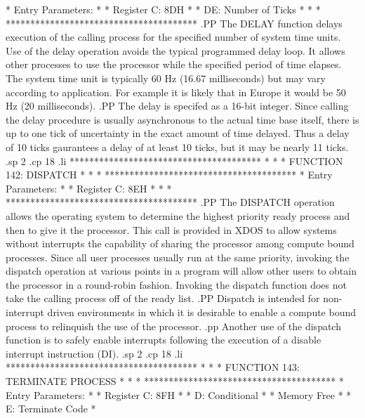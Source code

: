 *  Entry Parameters:                  *
*      Register   C:  8DH             *
*                DE:  Number of Ticks *
*                                     *
***************************************
.PP
The DELAY function delays execution of the
calling process for the specified number of system time units.
Use of the delay operation avoids the typical programmed delay
loop.  It allows other processes to use the processor while the
specified period of time elapses.  The system time unit is typically
60 Hz (16.67 milliseconds) but may vary according to application.
For example it is likely that in Europe it would be 50 Hz (20
milliseconds).
.PP
The delay is specifed as a 16-bit integer.  Since calling the delay
procedure is usually asynchronous to the actual time base itself, there
is up to one tick of uncertainty in the exact amount of time delayed.
Thus a delay of 10 ticks gaurantees a delay of at least 10 ticks, but
it may be nearly 11 ticks.
.sp 2
.cp 18
.li
***************************************
*                                     *
*  FUNCTION 142:  DISPATCH            *
*                                     *
***************************************
*  Entry Parameters:                  *
*      Register   C:  8EH             *
*                                     *
***************************************
.PP
The DISPATCH operation allows the operating system
to determine the highest priority ready process and then to give it the
processor.  This call is provided in XDOS to allow systems without
interrupts the capability of sharing the processor among compute
bound processes.  Since all user processes usually run at the same
priority, invoking the dispatch operation at various points
in a program will allow other users to obtain the processor
in a round-robin fashion.
Invoking the dispatch function does not take the calling process off
of the ready list.
.PP
Dispatch is intended for non-interrupt driven environments in
which it is desirable to enable a compute bound process
to relinquish the use of the processor.
.pp
Another use of the dispatch function is to safely enable interrupts
following the execution of a disable interrupt instruction (DI).
.sp 2
.cp 18
.li
***************************************
*                                     *
*  FUNCTION 143:  TERMINATE PROCESS   *
*                                     *
***************************************
*  Entry Parameters:                  *
*      Register   C:  8FH             *
*                 D:  Conditional     *
*                      Memory Free    *
*                 E:  Terminate Code  *
